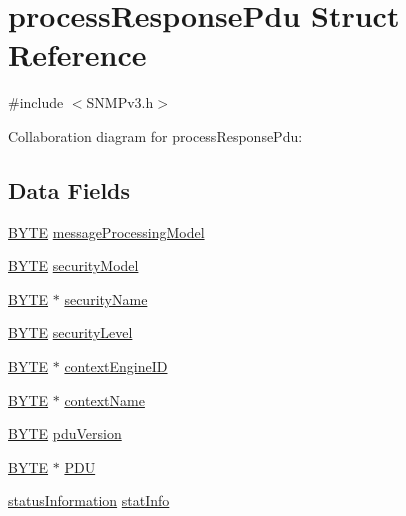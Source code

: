 \hypertarget{structprocess_response_pdu}{}\section{process\+Response\+Pdu Struct Reference}
\label{structprocess_response_pdu}


{\ttfamily \#include $<$S\+N\+M\+Pv3.\+h$>$}



Collaboration diagram for process\+Response\+Pdu\+:
\subsection*{Data Fields}
\begin{DoxyCompactItemize}
\item 
\hyperlink{_generic_type_defs_8h_a4ae1dab0fb4b072a66584546209e7d58}{B\+Y\+T\+E} \hyperlink{structprocess_response_pdu_a47f1a1b8f7a3fe5623fe37df094ac032}{message\+Processing\+Model}
\item 
\hyperlink{_generic_type_defs_8h_a4ae1dab0fb4b072a66584546209e7d58}{B\+Y\+T\+E} \hyperlink{structprocess_response_pdu_ac19ed44216346e9d6c50819813db6867}{security\+Model}
\item 
\hyperlink{_generic_type_defs_8h_a4ae1dab0fb4b072a66584546209e7d58}{B\+Y\+T\+E} $\ast$ \hyperlink{structprocess_response_pdu_a4a48a8746988a1f761c3e9eadcc20463}{security\+Name}
\item 
\hyperlink{_generic_type_defs_8h_a4ae1dab0fb4b072a66584546209e7d58}{B\+Y\+T\+E} \hyperlink{structprocess_response_pdu_a9314d7b462ce4cc59202ed48fcdd9945}{security\+Level}
\item 
\hyperlink{_generic_type_defs_8h_a4ae1dab0fb4b072a66584546209e7d58}{B\+Y\+T\+E} $\ast$ \hyperlink{structprocess_response_pdu_aa75baf2d001f5d5ac415eed279fd6e85}{context\+Engine\+I\+D}
\item 
\hyperlink{_generic_type_defs_8h_a4ae1dab0fb4b072a66584546209e7d58}{B\+Y\+T\+E} $\ast$ \hyperlink{structprocess_response_pdu_af55ce5882ccbc8435fb33f1020c74550}{context\+Name}
\item 
\hyperlink{_generic_type_defs_8h_a4ae1dab0fb4b072a66584546209e7d58}{B\+Y\+T\+E} \hyperlink{structprocess_response_pdu_a731491a51ee1a2971e5cd7d7446c1dab}{pdu\+Version}
\item 
\hyperlink{_generic_type_defs_8h_a4ae1dab0fb4b072a66584546209e7d58}{B\+Y\+T\+E} $\ast$ \hyperlink{structprocess_response_pdu_abf0d7b0afb4ebcedb2a0138c9b14fdb5}{P\+D\+U}
\item 
\hyperlink{_s_n_m_pv3_8h_a074d8e7ed4175677b89b7c8d5d45e294}{status\+Information} \hyperlink{structprocess_response_pdu_ad07540e94950d793173ffdb63915b853}{stat\+Info}
\end{DoxyCompactItemize}



